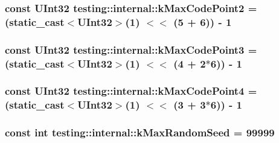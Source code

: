 \subsubsection[{\texorpdfstring{k\+Max\+Code\+Point2}{kMaxCodePoint2}}]{\setlength{\rightskip}{0pt plus 5cm}const {\bf U\+Int32} testing\+::internal\+::k\+Max\+Code\+Point2 = (static\+\_\+cast$<${\bf U\+Int32}$>$(1) $<$$<$ (5 + 6)) -\/ 1}\hypertarget{namespacetesting_1_1internal_ab8f4a5ed784352f00342cfeadc72337e}{}\label{namespacetesting_1_1internal_ab8f4a5ed784352f00342cfeadc72337e}
\subsubsection[{\texorpdfstring{k\+Max\+Code\+Point3}{kMaxCodePoint3}}]{\setlength{\rightskip}{0pt plus 5cm}const {\bf U\+Int32} testing\+::internal\+::k\+Max\+Code\+Point3 = (static\+\_\+cast$<${\bf U\+Int32}$>$(1) $<$$<$ (4 + 2$\ast$6)) -\/ 1}\hypertarget{namespacetesting_1_1internal_aa42bd507418e570402996e33582beed3}{}\label{namespacetesting_1_1internal_aa42bd507418e570402996e33582beed3}
\subsubsection[{\texorpdfstring{k\+Max\+Code\+Point4}{kMaxCodePoint4}}]{\setlength{\rightskip}{0pt plus 5cm}const {\bf U\+Int32} testing\+::internal\+::k\+Max\+Code\+Point4 = (static\+\_\+cast$<${\bf U\+Int32}$>$(1) $<$$<$ (3 + 3$\ast$6)) -\/ 1}\hypertarget{namespacetesting_1_1internal_acd87c60be9b5fedb2d017503d8834474}{}\label{namespacetesting_1_1internal_acd87c60be9b5fedb2d017503d8834474}
\subsubsection[{\texorpdfstring{k\+Max\+Random\+Seed}{kMaxRandomSeed}}]{\setlength{\rightskip}{0pt plus 5cm}const int testing\+::internal\+::k\+Max\+Random\+Seed = 99999}\hypertarget{namespacetesting_1_1internal_a41bd421ace53d23dbe85d9618c3afaee}{}\label{namespacetesting_1_1internal_a41bd421ace53d23dbe85d9618c3afaee}
